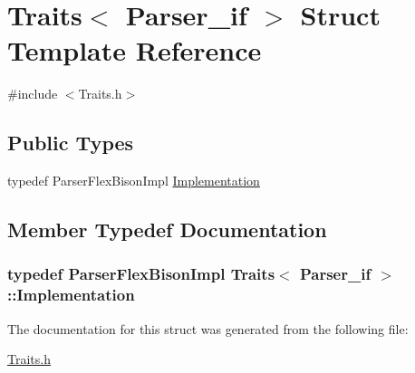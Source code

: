 \hypertarget{struct_traits_3_01_parser__if_01_4}{}\section{Traits$<$ Parser\+\_\+if $>$ Struct Template Reference}
\label{struct_traits_3_01_parser__if_01_4}


{\ttfamily \#include $<$Traits.\+h$>$}

\subsection*{Public Types}
\begin{DoxyCompactItemize}
\item 
typedef Parser\+Flex\+Bison\+Impl \hyperlink{struct_traits_3_01_parser__if_01_4_ac4b3058438c07381c066f9a376c01b05}{Implementation}
\end{DoxyCompactItemize}


\subsection{Member Typedef Documentation}
\subsubsection[{\texorpdfstring{Implementation}{Implementation}}]{\setlength{\rightskip}{0pt plus 5cm}typedef Parser\+Flex\+Bison\+Impl {\bf Traits}$<$ {\bf Parser\+\_\+if} $>$\+::{\bf Implementation}}\hypertarget{struct_traits_3_01_parser__if_01_4_ac4b3058438c07381c066f9a376c01b05}{}\label{struct_traits_3_01_parser__if_01_4_ac4b3058438c07381c066f9a376c01b05}


The documentation for this struct was generated from the following file\+:\begin{DoxyCompactItemize}
\item 
\hyperlink{_traits_8h}{Traits.\+h}\end{DoxyCompactItemize}
